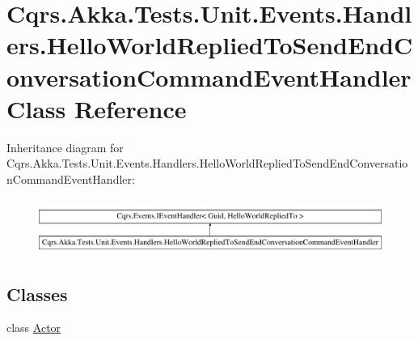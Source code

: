\hypertarget{classCqrs_1_1Akka_1_1Tests_1_1Unit_1_1Events_1_1Handlers_1_1HelloWorldRepliedToSendEndConversationCommandEventHandler}{}\section{Cqrs.\+Akka.\+Tests.\+Unit.\+Events.\+Handlers.\+Hello\+World\+Replied\+To\+Send\+End\+Conversation\+Command\+Event\+Handler Class Reference}
\label{classCqrs_1_1Akka_1_1Tests_1_1Unit_1_1Events_1_1Handlers_1_1HelloWorldRepliedToSendEndConversationCommandEventHandler}
Inheritance diagram for Cqrs.\+Akka.\+Tests.\+Unit.\+Events.\+Handlers.\+Hello\+World\+Replied\+To\+Send\+End\+Conversation\+Command\+Event\+Handler\+:\begin{figure}[H]
\begin{center}
\leavevmode
\includegraphics[height=1.827080cm]{classCqrs_1_1Akka_1_1Tests_1_1Unit_1_1Events_1_1Handlers_1_1HelloWorldRepliedToSendEndConversationCommandEventHandler}
\end{center}
\end{figure}
\subsection*{Classes}
\begin{DoxyCompactItemize}
\item 
class \hyperlink{classCqrs_1_1Akka_1_1Tests_1_1Unit_1_1Events_1_1Handlers_1_1HelloWorldRepliedToSendEndConversationCommandEventHandler_1_1Actor}{Actor}
\end{DoxyCompactItemize}
